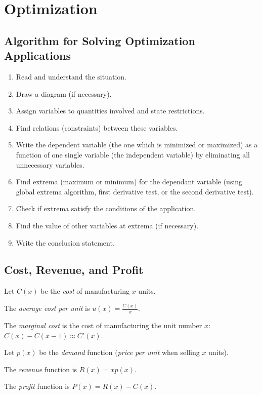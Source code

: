 \section{Optimization}
\subsection{Algorithm for Solving Optimization Applications}
	\begin{enumerate}
		\item Read and understand the situation.
		\item Draw a diagram (if necessary).
		\item Assign variables to quantities involved and state restrictions.
		\item Find relations (constraints) between these variables.
		\item Write the dependent variable (the one which is minimized or maximized) as a function of one single variable (the independent variable) by eliminating all unnecessary variables.
		\item Find extrema (maximum or minimum) for the dependant variable (using global extrema algorithm, first derivative test, or the second derivative test).
		\item Check if extrema satisfy the conditions of the application.
		\item Find the value of other variables at extrema (if necessary).
		\item Write the conclusion statement.
	\end{enumerate}
\subsection{Cost, Revenue, and Profit}
	Let $C(x)$ be the \emph{cost} of manufacturing $x$ units.

	The \emph{average cost per unit} is $u(x) = \frac{C(x)}{x}$.

	The \emph{marginal cost} is the cost of manufacturing the unit number $x$: $C(x) - C(x-1) \approx C'(x)$.

	Let $p(x)$ be the \emph{demand} function (\emph{price per unit} when selling $x$ units).

	The \emph{revenue} function is $R(x) = xp(x)$.

	The \emph{profit} function is $P(x) = R(x) - C(x)$.
